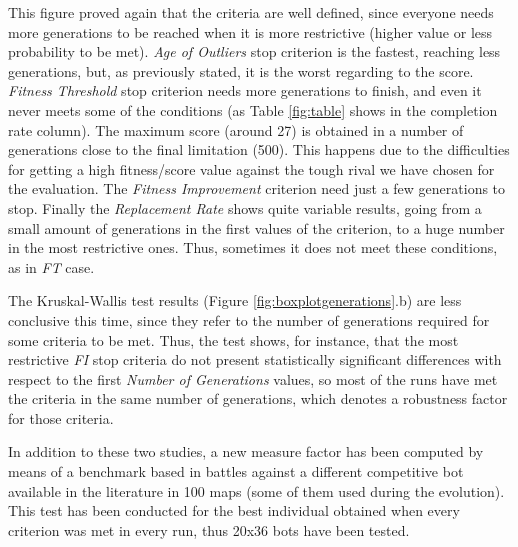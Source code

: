 \documentclass[runningheads,a4paper]{llncs}
\begin{document}


This figure proved again that the criteria are well defined, since everyone needs more generations to be reached when it is more restrictive (higher value or less probability to be met). \textit{Age of Outliers} stop criterion is the fastest, reaching less generations, but, as previously stated, it is the worst regarding to the score.  \textit{Fitness Threshold} stop criterion needs more generations to finish, and even it never meets some of the conditions (as Table \ref{fig:table} shows in the completion rate column). The maximum score (around 27) is obtained in a number of generations close to the final limitation (500). This happens due to the difficulties for getting a high fitness/score value against the tough rival we have chosen for the evaluation. The \textit{Fitness Improvement} criterion need just a few generations to stop. Finally the \textit{Replacement Rate} shows quite variable results, going from a small amount of generations in the first values of the criterion, to  a huge number in the most restrictive ones. Thus, sometimes it does not meet these conditions, as in \textit{FT} case.

The Kruskal-Wallis test results (Figure \ref{fig:boxplotgenerations}.b) are less conclusive this time, since they refer to the number of generations required for some criteria to be met. Thus, the test shows, for instance, that the most restrictive \textit{FI} stop criteria do not present statistically significant differences with respect to the first \textit{Number of Generations} values, so most of the runs have met the criteria in the same number of generations, which denotes a robustness factor for those criteria. %



In addition to these two studies, a new measure factor has been
computed by means of a benchmark based in battles against a different competitive bot
available in the literature \cite{DBLP:conf/cig/Fernandez-AresGMG12} in 100 maps (some of them used during the evolution). This test has been conducted for the best individual obtained when every criterion was met in every run, thus 20x36 bots have been tested.
\end{document}
